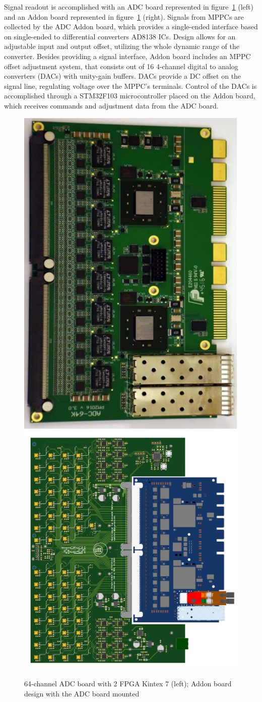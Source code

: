 \documentclass[a4paper,11pt]{article}
\begin{document}
Signal readout is accomplished with an ADC board represented in figure~\ref{fig:3} (left) and an Addon board represented in figure~\ref{fig:3} (right). Signals from MPPCs are collected by the ADC Addon board, which provides a single-ended interface based on single-ended to differential converters AD8138 ICs. Design allows for an adjustable input and output offset, utilizing the whole dynamic range of the converter. Besides providing a signal interface, Addon board includes an MPPC offset adjustment system, that consists out of 16 4-channel digital to analog converters (DACs) with unity-gain buffers. DACs provide a DC offset on the signal line, regulating voltage over the MPPC's terminals. Control of the DACs is accomplished through a STM32F103 microcontroller placed on the Addon board, which receives commands and adjustment data from the ADC board.

\begin{figure}[htbp]
	\centering
	\includegraphics[width=.2\textwidth]{ADC_board.png}
	\quad
\includegraphics[width=.6\textwidth]{ADC_addon.png}
	\caption{\label{fig:3} 64-channel ADC board with 2 FPGA Kintex 7 (left); Addon board design with the ADC board mounted}
\end{figure}
\end{document}
